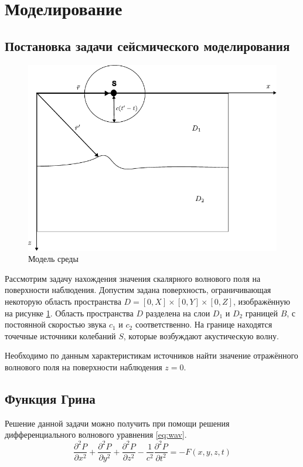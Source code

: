 \documentclass[a4paper, fontsize=14pt]{article}
\begin{document}
	
	\newpage
	\section{Моделирование} 
	\subsection{Постановка задачи сейсмического моделирования} 
	\begin{figure}[h]
		
		\centering
		\includegraphics{migration_fig.pdf}
		
		\caption{Модель среды}
		\label{fig:mig}
	\end{figure}
	Рассмотрим задачу нахождения значения скалярного волнового поля на поверхности
	наблюдения.
	Допустим задана поверхность, ограничивающая некоторую область пространства
	$D=[0,X]\times [0,Y]\times [0,Z]$, изображённую на рисунке \ref{fig:mig}.
	Область пространства $D$ разделена на слои $D_1$ и $D_2$ границей $B$, с постоянной
	скоростью звука $c_1$ и $c_2$ соответственно.
	На границе находятся точечные источники колебаний $S$, которые возбуждают
	акустическую волну.
	
	Необходимо по данным характеристикам источников найти значение отражённого волнового поля
	на поверхности наблюдения $z=0$.
	


	\subsection{Функция Грина} 
		Решение данной задачи можно получить при помощи решения
	дифференциального волнового уравнения \ref{eq:wav}. 
	\begin{equation}
		\frac{\partial^2 P}{\partial x^2} + \frac{\partial^2 P}{\partial y^2} +
		\frac{\partial^2 P}{\partial z^2} - \frac{1}{c^2} \frac{\partial^2 P}{\partial
			t^2} = -F(x,y,z,t)   
		\label{eq:wav}	
	\end{equation}
	
\end{document}
